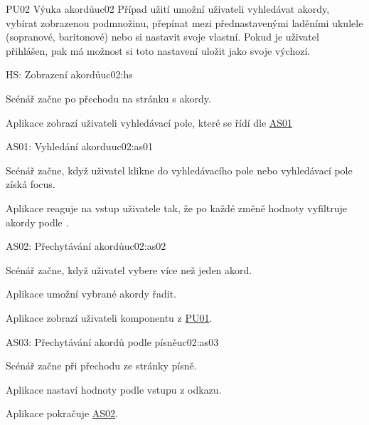 \begin{usecase}{PU02 Výuka akordů}{uc02}
    Případ užití umožní uživateli vyhledávat akordy, vybírat zobrazenou podmnožinu, přepínat mezi přednastavenými laděními ukulele (sopranové, baritonové) nebo si nastavit svoje vlastní. Pokud je uživatel přihlášen, pak má možnost si toto nastavení uložit jako svoje výchozí.

    \begin{scenario}{HS: Zobrazení akordů}{uc02:hs}
        \item Scénář začne po přechodu na stránku s akordy.
        \item Aplikace zobrazí uživateli vyhledávací pole, které se řídí dle \hyperref[uc02:as01]{AS01}
    \end{scenario}

    \begin{scenario}{AS01: Vyhledání akordu}{uc02:as01}
        \item Scénář začne, když uživatel klikne do vyhledávacího pole nebo vyhledávací pole získá focus.
        \item Aplikace reaguje na vstup uživatele tak, že po každé změně hodnoty vyfiltruje akordy podle .
    \end{scenario}

    \begin{scenario}{AS02: Přechytávání akordů}{uc02:as02}
        \item Scénář začne, když uživatel vybere více než jeden akord.
        \item Aplikace umožní vybrané akordy řadit.
        \item Aplikace zobrazí uživateli komponentu z \hyperref[uc01]{PU01}.
    \end{scenario}

    \begin{scenario}{AS03: Přechytávání akordů podle písně}{uc02:as03}
        \item Scénář začne při přechodu ze stránky písně.
        \item Aplikace nastaví hodnoty podle vstupu z odkazu.
        \item Aplikace pokračuje \hyperref[uc02:as02]{AS02}.
    \end{scenario}



\end{usecase}
